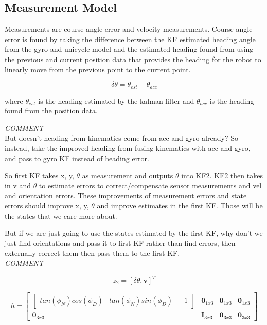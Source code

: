 \subsection{Measurement Model}

Measurements are course angle error and velocity measurements. Course angle error
is found by taking the difference between the KF estimated heading angle from the 
gyro and unicycle model and the estimated heading found from using the previous 
and current position data that provides the heading for the robot to linearly 
move from the previous point to the current point.

\begin{equation}
  \delta\theta = \theta_{est} - \theta_{acc}
\end{equation}

where $\theta_{est}$ is the heading estimated by the kalman filter and $\theta_{acc}$ 
is the heading found from the position data. 

\emph{COMMENT} \\
But doesn't heading from kinematics come from acc and gyro already? So instead,
take the improved heading from fusing kinematics with acc and gyro, and pass to 
gyro KF instead of heading error. 

So first KF takes x, y, $\theta$ as measurement and outputs $\theta$ into KF2. 
KF2 then takes in v and $\theta$ to estimate errors to correct/compensate 
sensor measurements and vel and orientation errors. These improvements of 
measurement errors and state errors should improve x, y, $\theta$ and improve 
estimates in the first KF. Those will be the states that we care more about.

But if we are just going to use the states estimated by the first KF, why don't 
we just find orientations and pass it to first KF rather than find errors, then 
externally correct them then pass them to the first KF. 
\\
\emph{COMMENT}

\begin{equation}
  z_2 = [\delta\theta, \boldsymbol{v}]^T
\end{equation}

\begin{equation}
  h = \begin{bmatrix}
      \begin{bmatrix}tan(\phi_N)cos(\phi_D) & tan(\phi_N)sin(\phi_D) & -1\end{bmatrix} & \boldsymbol{0}_{1x3} & \boldsymbol{0}_{1x3} & \boldsymbol{0}_{1x3} \\
      \boldsymbol{0}_{3x3} & \boldsymbol{I}_{3x3} & \boldsymbol{0}_{3x3} & \boldsymbol{0}_{3x3}
      \end{bmatrix}
\end{equation}

